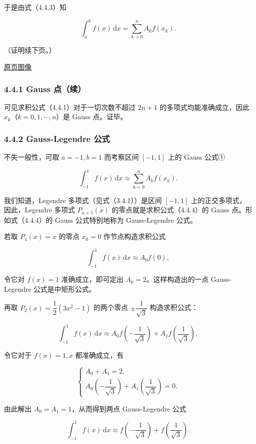 \documentclass[
  10pt,
  fontset=fandol]{ctexart}
\begin{document}
于是由式（4.4.3）知

\[
\int_a^b f(x)\,\mathrm{d}x=\sum_{k=0}^{n}A_kf(x_k).
\]

（证明续下页。）

\href{../../source-images/pdf-108.jpeg}{原页图像}

\subsubsection{4.4.1 Gauss 点（续）}\label{gauss-ux70b9ux7eed}

可见求积公式（4.4.1）对于一切次数不超过 \(2n+1\) 的多项式均能准确成立，因此 \(x_k\)（\(k=0,1,\cdots,n\)）是 Gauss 点。证毕。

\subsubsection{4.4.2 Gauss-Legendre 公式}\label{gauss-legendre-ux516cux5f0f}

不失一般性，可取 \(a=-1,b=1\) 而考察区间 \([-1,1]\) 上的 Gauss 公式①

\[
\int_{-1}^{1}f(x)\,\mathrm{d}x\approx\sum_{k=0}^{n}A_kf(x_k).
\tag{4.4.4}
\]

我们知道，Legendre 多项式（见式（3.4.1））是区间 \([-1,1]\) 上的正交多项式，因此，Legendre 多项式 \(P_{n+1}(x)\) 的零点就是求积公式（4.4.4）的 Gauss 点。形如式（4.4.4）的 Gauss 公式特别地称为 Gauss-Legendre 公式。

若取 \(P_1(x)=x\) 的零点 \(x_0=0\) 作节点构造求积公式

\[
\int_{-1}^{1}f(x)\,\mathrm{d}x\approx A_0f(0),
\]

令它对 \(f(x)=1\) 准确成立，即可定出 \(A_0=2\)。这样构造出的一点 Gauss-Legendre 公式是中矩形公式。

再取 \(P_2(x)=\dfrac12(3x^2-1)\) 的两个零点 \(\pm\dfrac1{\sqrt3}\) 构造求积公式：

\[
\int_{-1}^{1}f(x)\,\mathrm{d}x\approx
A_0f\left(-\frac1{\sqrt3}\right)+A_1f\left(\frac1{\sqrt3}\right),
\]

令它对于 \(f(x)=1,x\) 都准确成立，有

\[
\begin{cases}
A_0+A_1=2,\\[3pt]
A_0\left(-\dfrac1{\sqrt3}\right)+A_1\left(\dfrac1{\sqrt3}\right)=0.
\end{cases}
\]

由此解出 \(A_0=A_1=1\)，从而得到两点 Gauss-Legendre 公式

\[
\int_{-1}^{1}f(x)\,\mathrm{d}x\approx
f\left(-\frac1{\sqrt3}\right)+f\left(\frac1{\sqrt3}\right).
\]
\end{document}
